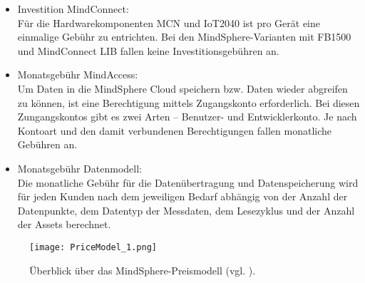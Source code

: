 \begin{itemize}
	\item Investition MindConnect:\\
    Für die Hardwarekomponenten \ac{MCN} und \ac{IoT2040} ist pro Gerät eine einmalige Gebühr zu entrichten. Bei den MindSphere-Varianten mit FB1500 und MindConnect LIB fallen keine Investitionsgebühren an.    	
  	\item Monatsgebühr MindAccess:\\
    Um Daten in die MindSphere Cloud speichern bzw. Daten wieder abgreifen zu können, ist eine Berechtigung mittels Zugangskonto erforderlich. Bei diesen Zungangskontos gibt es zwei Arten -- Benutzer- und Entwicklerkonto. Je nach Kontoart und den damit verbundenen Berechtigungen fallen monatliche Gebühren an.
  	\item Monatsgebühr Datenmodell:\\
    Die monatliche Gebühr für die Datenübertragung und Datenspeicherung wird für jeden Kunden nach dem jeweiligen Bedarf abhängig von der Anzahl der Datenpunkte, dem Datentyp der Messdaten, dem Lesezyklus und der Anzahl der Assets berechnet. 
\end{itemize}

\begin{figure}[H]
\centering
\texttt{[image: PriceModel\_1.png]} 
\caption{Überblick über das MindSphere-Preismodell (vgl. \cite{SiemensMSIntroduction}).}
\label{fig:PriceModel}
\end{figure}















